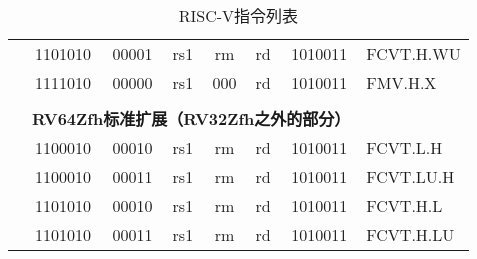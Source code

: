 \begin{table}[p]
\begin{small}
\begin{center}
\begin{tabular}{p{0in}p{0.4in}p{0.05in}p{0.05in}p{0.05in}p{0.05in}p{0.4in}p{0.6in}p{0.4in}p{0.6in}p{0.7in}l}
&
\multicolumn{4}{|c|}{1101010} &
\multicolumn{2}{c|}{00001} &
\multicolumn{1}{c|}{rs1} &
\multicolumn{1}{c|}{rm} &
\multicolumn{1}{c|}{rd} &
\multicolumn{1}{c|}{1010011} & FCVT.H.WU \\
\cline{2-11}


&
\multicolumn{4}{|c|}{1111010} &
\multicolumn{2}{c|}{00000} &
\multicolumn{1}{c|}{rs1} &
\multicolumn{1}{c|}{000} &
\multicolumn{1}{c|}{rd} &
\multicolumn{1}{c|}{1010011} & FMV.H.X \\
\cline{2-11}


&
\multicolumn{10}{c}{} & \\
&
\multicolumn{10}{c}{\bf RV64Zfh标准扩展（RV32Zfh之外的部分）} & \\
\cline{2-11}


&
\multicolumn{4}{|c|}{1100010} &
\multicolumn{2}{c|}{00010} &
\multicolumn{1}{c|}{rs1} &
\multicolumn{1}{c|}{rm} &
\multicolumn{1}{c|}{rd} &
\multicolumn{1}{c|}{1010011} & FCVT.L.H \\
\cline{2-11}


&
\multicolumn{4}{|c|}{1100010} &
\multicolumn{2}{c|}{00011} &
\multicolumn{1}{c|}{rs1} &
\multicolumn{1}{c|}{rm} &
\multicolumn{1}{c|}{rd} &
\multicolumn{1}{c|}{1010011} & FCVT.LU.H \\
\cline{2-11}


&
\multicolumn{4}{|c|}{1101010} &
\multicolumn{2}{c|}{00010} &
\multicolumn{1}{c|}{rs1} &
\multicolumn{1}{c|}{rm} &
\multicolumn{1}{c|}{rd} &
\multicolumn{1}{c|}{1010011} & FCVT.H.L \\
\cline{2-11}


&
\multicolumn{4}{|c|}{1101010} &
\multicolumn{2}{c|}{00011} &
\multicolumn{1}{c|}{rs1} &
\multicolumn{1}{c|}{rm} &
\multicolumn{1}{c|}{rd} &
\multicolumn{1}{c|}{1010011} & FCVT.H.LU \\
\cline{2-11}


\end{tabular}
\end{center}
\end{small}
\caption{RISC-V指令列表}
\end{table}

